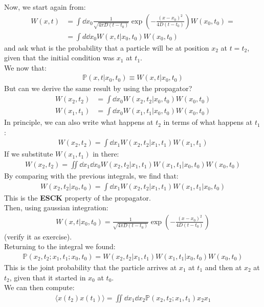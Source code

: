 \documentclass[../template.tex]{subfiles}
\begin{document}
Now, we start again from:
\begin{align*}
    W(x,t) &= \int \dd{x_0} \frac{1}{\sqrt{4 \pi D (t-t_0 )}} \exp\left(-\frac{(x-x_0 )^2}{4 D (t-t_0)} \right)  W(x_0, t_0) =\\
    &= \int d\dd{x_0} W(x,t|x_0, t_0) W(x_0, t_0)
\end{align*}
and ask what is the probability that a particle will be at position $x_2$ at $t=t_2$, given that the initial condition was $x_1$ at $t_1$.\\
We now that:
\begin{align*}
    \mathbb{P}(x,t|x_0, t_0) \equiv W(x,t|x_0, t_0)
\end{align*}
But can we derive the same result by using the propagator?
\begin{align*}
    W(x_2, t_2) &= \int \dd{x_0} W(x_2, t_2|x_0, t_0) W(x_0, t_0)\\
    W(x_1, t_1) &= \int \dd{x_0} W(x_1, t_1|x_0, t_0) W(x_0, t_0) 
\end{align*}
In principle, we can also write what happens at $t_2$ in terms of what happens at $t_1$:
\begin{align*}
    W(x_2, t_2) = \int \dd{x_1} W(x_2, t_2 | x_1, t_1) W(x_1, t_1)
\end{align*}  
If we substitute $W(x_1, t_1)$ in there:
\begin{align*}
    W(x_2, t_2) = \iint \dd{x_1} \dd{x_0} W(x_2, t_2 | x_1, t_1) W(x_1, t_1 | x_0, t_0) W(x_0, t_0)
\end{align*} 
By comparing with the previous integrals, we find that:
\begin{align*}
    W(x_2, t_2 | x_0, t_0) = \int \dd{x_1} W(x_2, t_2 | x_1, t_1) W(x_1, t_1 | x_0, t_0)
\end{align*}
This is the \textbf{ESCK} property of the propagator.\\
Then, using gaussian integration:
\begin{align*}
    W(x,t|x_0, t_0) = \frac{1}{\sqrt{4 \pi D (t-t_0) }} \exp\left(-\frac{(x-x_0)^2}{4 D (t-t_0)} \right) 
\end{align*} 
(verify it as exercise).\\

Returning to the integral we found:
\begin{align*}
    \mathbb{P}(x_2, t_2; x_1, t_1; x_0, t_0) = W(x_2, t_2|x_1, t_1) W(x_1, t_1 | x_0, t_0) W(x_0, t_0)
\end{align*}
This is the joint probability that the particle arrives at $x_1$ at $t_1$ and then at $x_2$ at $t_2$, given that it started in $x_0$ at $t_0$.\\
We can then compute:
\begin{align*}
    \langle x(t_2) x(t_1) \rangle = \iint \dd{x_1} \dd{x_2} \mathbb{P}(x_2, t_2; x_1, t_1) x_2 x_1
\end{align*}
\end{document}

